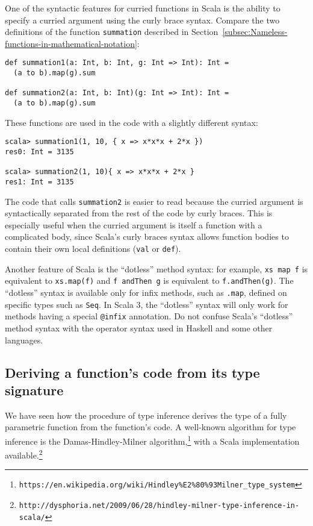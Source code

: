 One of the syntactic features for curried functions in Scala is the
ability to specify a curried argument using the curly brace syntax.
Compare the two definitions of the function \lstinline!summation!
described in Section~\ref{subsec:Nameless-functions-in-mathematical-notation}:
\begin{lstlisting}
def summation1(a: Int, b: Int, g: Int => Int): Int =
  (a to b).map(g).sum

def summation2(a: Int, b: Int)(g: Int => Int): Int =
  (a to b).map(g).sum
\end{lstlisting}
These functions are used in the code with a slightly different syntax:
\begin{lstlisting}
scala> summation1(1, 10, { x => x*x*x + 2*x })
res0: Int = 3135

scala> summation2(1, 10){ x => x*x*x + 2*x }
res1: Int = 3135
\end{lstlisting}

The code that calls \lstinline!summation2! is easier to read because
the curried argument is syntactically separated from the rest of the
code by curly braces. This is especially useful when the curried argument
is itself a function with a complicated body, since Scala's curly
braces syntax allows function bodies to contain their own local definitions
(\lstinline!val! or \lstinline!def!).

Another feature of Scala is the ``dotless'' method syntax: for example,
\lstinline!xs map f! is equivalent to \lstinline!xs.map(f)! and
\lstinline!f andThen g! is equivalent to \lstinline!f.andThen(g)!.
The ``dotless'' syntax is available only for infix methods, such
as \lstinline!.map!, defined on specific types such as \lstinline!Seq!.
In Scala 3, the ``dotless'' syntax will only work for methods having
a special \lstinline!@infix! annotation. Do not confuse Scala's ``dotless''
method syntax with the operator syntax used in Haskell and some other
languages.

\subsection{Deriving a function's code from its type signature\label{subsec:Deriving-a-function's}}

We have seen how the procedure of type inference
derives the type of a fully parametric function from the function's
code. A well-known algorithm for type inference is the Damas-Hindley-Milner
algorithm,\footnote{\texttt{https://en.wikipedia.org/wiki/Hindley\%E2\%80\%93Milner\_type\_system}}
with a Scala implementation available.\footnote{\texttt{http://dysphoria.net/2009/06/28/hindley-milner-type-inference-in-scala/}}

